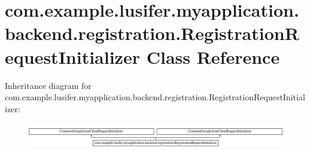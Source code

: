 \hypertarget{classcom_1_1example_1_1lusifer_1_1myapplication_1_1backend_1_1registration_1_1_registration_request_initializer}{}\section{com.\+example.\+lusifer.\+myapplication.\+backend.\+registration.\+Registration\+Request\+Initializer Class Reference}
\label{classcom_1_1example_1_1lusifer_1_1myapplication_1_1backend_1_1registration_1_1_registration_request_initializer}
Inheritance diagram for com.\+example.\+lusifer.\+myapplication.\+backend.\+registration.\+Registration\+Request\+Initializer\+:\begin{figure}[H]
\begin{center}
\leavevmode
\includegraphics[height=1.129032cm]{classcom_1_1example_1_1lusifer_1_1myapplication_1_1backend_1_1registration_1_1_registration_request_initializer}
\end{center}
\end{figure}
